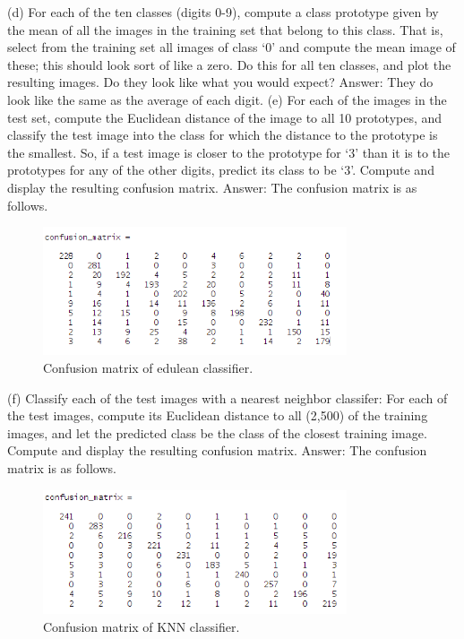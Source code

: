 \documentclass[paper=a4, fontsize=11pt]{scrartcl} %
\numberwithin{equation}{section} %
\numberwithin{figure}{section} %
\numberwithin{table}{section} %
\begin{document}
(d) For each of the ten classes (digits 0-9), compute a class prototype given by the mean of all the images in
the training set that belong to this class. That is, select from the training set all images of class `0' and
compute the mean image of these; this should look sort of like a zero. Do this for all ten classes, and plot
the resulting images. Do they look like what you would expect?
\newline
\newline
Answer:
\newline
They do look like the same as the average of each digit.
\newline
\newline
(e) For each of the images in the test set, compute the Euclidean distance of the image to all 10 prototypes,
and classify the test image into the class for which the distance to the prototype is the smallest. So, if a
test image is closer to the prototype for `3' than it is to the prototypes for any of the other digits, predict
its class to be `3'. Compute and display the resulting confusion matrix.
\newline
Answer:
\newline
The confusion matrix is as follows.
\begin{figure}[h!]

  \centering
    \includegraphics[width=0.8\textwidth]{confusion_matrix_edulean_dis}
      \caption{Confusion matrix of edulean classifier.}
\end{figure}
\newline
\newline
(f) Classify each of the test images with a nearest neighbor classifer: For each of the test images, compute
its Euclidean distance to all (2,500) of the training images, and let the predicted class be the class of the
closest training image. Compute and display the resulting confusion matrix.
\newline
Answer:
\newline
The confusion matrix is as follows.
\begin{figure}[h!]
  \centering
    \includegraphics[width=0.8\textwidth]{confusion_matrix_knn}
      \caption{Confusion matrix of KNN classifier.}
\end{figure}
\end{document}
